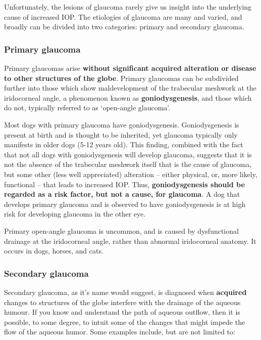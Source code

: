 \documentclass[
  openany]{article}
\begin{document}
Unfortunately, the lesions of glaucoma rarely give us insight into the underlying cause of increased IOP. The etiologies of glaucoma are many and varied, and broadly can be divided into two categories: primary and secondary glaucoma.

\hypertarget{primary-glaucoma}{%
\subsubsection{Primary glaucoma}\label{primary-glaucoma}}

Primary glaucomas arise \textbf{without significant acquired alteration or disease to other structures of the globe}. Primary glaucomas can be subdivided further into those which show maldevelopment of the trabecular meshwork at the iridocorneal angle, a phenomenon known as \textbf{goniodysgenesis}, and those which do not, typically referred to as `open-angle glaucoma'.

Most dogs with primary glaucoma have goniodysgenesis. Goniodysgenesis is present at birth and is thought to be inherited, yet glaucoma typically only manifests in older dogs (5-12 years old). This finding, combined with the fact that not all dogs with goniodysgenesis will develop glaucoma, suggests that it is not the absence of the trabecular meshwork itself that is the cause of glaucoma, but some other (less well appreciated) alteration -- either physical, or, more likely, functional -- that leads to increased IOP. Thus, \textbf{goniodysgenesis should be regarded as a risk factor, but not a cause, for glaucoma}. A dog that develops primary glaucoma and is observed to have goniodysgenesis is at high risk for developing glaucoma in the other eye.

Primary open-angle glaucoma is uncommon, and is caused by dysfunctional drainage at the iridocorneal angle, rather than abnormal iridocorneal anatomy. It occurs in dogs, horses, and cats.

\hypertarget{secondary-glaucoma}{%
\subsubsection{Secondary glaucoma}\label{secondary-glaucoma}}

Secondary glaucoma, as it's name would suggest, is diagnosed when \textbf{acquired} changes to structures of the globe interfere with the drainage of the aqueous humour. If you know and understand the path of aqueous outflow, then it is possible, to some degree, to intuit some of the changes that might impede the flow of the aqueous humor. Some examples include, but are not limited to:
\end{document}
